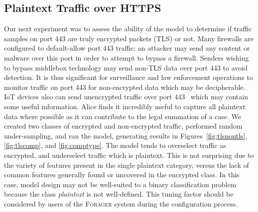 \subsection{Plaintext Traffic over HTTPS}
Our next experiment was to assess the ability of the model to determine if traffic samples on port 443 are truly encrypted packets (TLS) or not. Many firewalls are configured to default-allow port 443 traffic; an attacker may send any content or malware over this port in order to attempt to bypass a firewall. Senders wishing to bypass middlebox technology may send non-TLS data over port 443 to avoid detection. It is thus significant for surveillance and law enforcement operations to monitor traffic on port 443 for non-encrypted data which may be decipherable. IoT devices also can send unencrypted traffic over port 443~\cite{wood2017cleartext} which may contain some useful information. Alice finds it incredibly useful to capture all plaintext data where possible as it can contribute to the legal summation of a case. We created two classes of encrypted and non-encrypted traffic, performed random under-sampling, and ran the model, generating results in Figures~\ref{fig:tlsnontls}, \ref{fig:tlscomp}, and \ref{fig:comptype}. The model tends to overselect traffic as encrypted, and underselect traffic which is plaintext. This is not surprising due to the variety of features present in the single plaintext category, versus the lack of common features generally found or uncovered in the encrypted class. In this case, model design may not be well-suited to a binary classification problem because the class \textit{plaintext} is not well-defined. This tuning factor should be considered by users of the \textsc{Forager} system during the configuration process.

